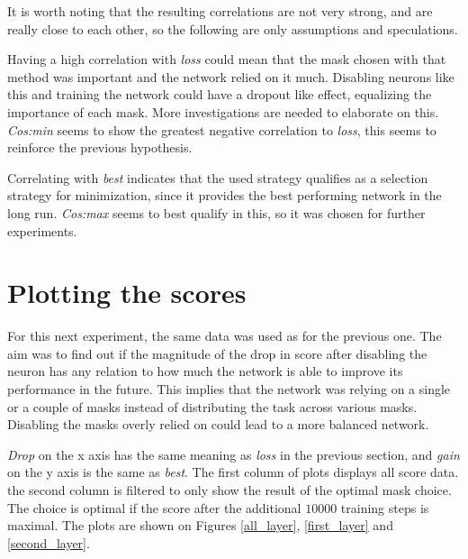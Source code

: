 \documentclass[12pt]{report}
\begin{document}
It is worth noting that the resulting correlations are not very strong, and are really close to each other, so the following are only assumptions and speculations.

Having a high correlation with \textit{loss} could mean that the mask chosen with that method was important and the network relied on it much. Disabling neurons like this and training the network could have a dropout like effect, equalizing the importance of each mask. More investigations are needed to elaborate on this. \textit{Cos:min} seems to show the greatest negative correlation to \textit{loss}, this seems to reinforce the previous hypothesis.

Correlating with \textit{best} indicates that the used strategy qualifies as a selection strategy for minimization, since it provides the best performing network in the long run. \textit{Cos:max} seems to best qualify in this, so it was chosen for further experiments.

\section{Plotting the scores}
For this next experiment, the same data was used as for the previous one. The aim was to find out if the magnitude of the drop in score after disabling the neuron has any relation to how much the network is able to improve its performance in the future. This implies that the network was relying on a single or a couple of masks instead of distributing the task across various masks. Disabling the masks overly relied on could lead to a more balanced network.

\textit{Drop} on the x axis has the same meaning as \textit{loss} in the previous section, and \textit{gain} on the y axis is the same as \textit{best}. The first column of plots displays all score data. the second column is filtered to only show the result of the optimal mask choice. The choice is optimal if the score after the additional $10000$ training steps is maximal. The plots are shown on Figures \ref{all_layer}, \ref{first_layer} and \ref{second_layer}.
\end{document}
